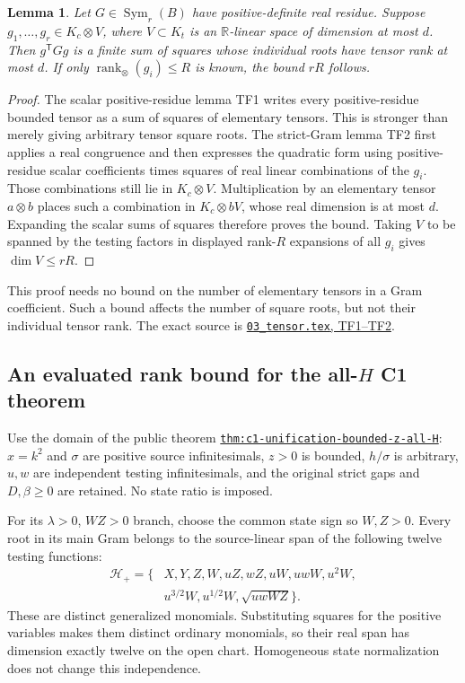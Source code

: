 \documentclass[11pt]{article}
\newtheorem{lemma}[proposition]{Lemma}
\newcommand{\R}{\mathbb R}
\newcommand{\rankt}{\operatorname{rank}_{\otimes}}
\begin{document}
\begin{lemma}\label{lem:rank}
Let $G\in\operatorname{Sym}_r(B)$ have positive-definite real
residue. Suppose $g_1,\ldots,g_r\in K_c\otimes V$, where
$V\subset K_t$ is an $\R$-linear space of dimension at most $d$.
Then $g^{\mathsf T}Gg$ is a finite sum of squares whose individual
roots have tensor rank at most $d$.
If only $\rankt(g_i)\le R$ is known, the bound $rR$ follows.
\end{lemma}
\begin{proof}
The scalar positive-residue lemma TF1 writes every positive-residue
bounded tensor as a sum of squares of elementary tensors. This is
stronger than merely giving arbitrary tensor square roots.
The strict-Gram lemma TF2 first applies a real congruence and then
expresses the quadratic form using positive-residue scalar
coefficients times squares of real linear combinations of the
$g_i$. Those combinations still lie in $K_c\otimes V$.
Multiplication by an elementary tensor $a\otimes b$ places such a
combination in $K_c\otimes bV$, whose real dimension is at most
$d$. Expanding the scalar sums of squares therefore proves the
bound. Taking $V$ to be spanned by the testing factors in displayed
rank-$R$ expansions of all $g_i$ gives $\dim V\le rR$.
\end{proof}

This proof needs no bound on the number of elementary tensors in a
Gram coefficient. Such a bound affects the number of square roots,
but not their individual tensor rank. The exact source is
\href{https://github.com/anubhav70747/q222-finite-sdp/blob/0c1ce2e15ed067a6845464e2468559cea5274f2c/latex/chapters/03_tensor.tex#L44-L118}
{\texttt{03\_tensor.tex}, TF1--TF2}.

\subsection{An evaluated rank bound for the all-$H$ C1 theorem}

Use the domain of the public theorem
\href{https://github.com/anubhav70747/q222-finite-sdp/blob/0c1ce2e15ed067a6845464e2468559cea5274f2c/latex/certificates/c1_short.tex#L7253-L7780}
{\texttt{thm:c1-unification-bounded-z-all-H}}:
$x=k^2$ and $\sigma$ are positive source infinitesimals,
$z>0$ is bounded, $h/\sigma$ is arbitrary, $u,w$ are independent
testing infinitesimals, and the original strict gaps and
$D,\beta\ge0$ are retained. No state ratio is imposed.

For its $\lambda>0$, $WZ>0$ branch, choose the common state sign
so $W,Z>0$. Every root in its main Gram belongs to the
source-linear span of the following twelve testing functions:
\begin{equation}\label{eq:h12}
\begin{split}
 \mathcal H_+=\{&X,Y,Z,W,uZ,wZ,uW,uwW,u^2W,\\
              &u^{3/2}W,u^{1/2}W,\sqrt{uwWZ}\}.
\end{split}
\end{equation}
These are distinct generalized monomials. Substituting squares
for the positive variables makes them distinct ordinary monomials,
so their real span has dimension exactly twelve on the open chart.
Homogeneous state normalization does not change this independence.
\end{document}
